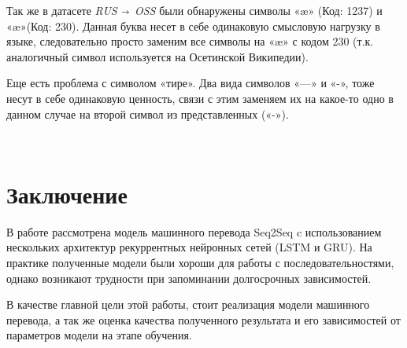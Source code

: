     Так же в датасете \textit{RUS $\shortrightarrow$ OSS} были обнаружены символы «æ» (Код: 1237) и «æ»(Код: 230). Данная буква несет в себе одинаковую смысловую нагрузку в языке, следовательно просто заменим все символы на «æ» с кодом 230 (т.к. аналогичный символ используется на Осетинской Википедии). 
    
    Еще есть проблема с символом «тире». Два вида символов «—» и «-», тоже несут в себе одинаковую ценность, связи с этим заменяем их на какое-то одно в данном случае на второй символ из представленных («-»).
	
	\begin{lstlisting}[language=iPython]
	
	\end{lstlisting}

    \clearpage
	
	\section{Заключение}
	
	В работе рассмотрена модель машинного перевода Seq2Seq c использованием нескольких архитектур рекуррентных нейронных сетей (LSTM и GRU). На практике полученные модели были хороши для работы с последовательностями, однако возникают трудности при запоминании долгосрочных зависимостей.
	
	В качестве главной цели этой работы, стоит реализация модели машинного перевода, а так же оценка качества полученного результата и его зависимостей от параметров модели на этапе обучения.
	
	\clearpage
	
	

